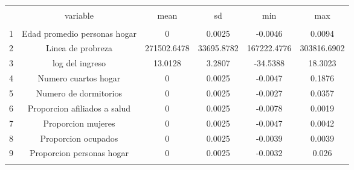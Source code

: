 
\begin{table}[!htbp] \centering 
  \caption{} 
  \label{} 
\begin{tabular}{@{\extracolsep{5pt}} cccccc} 
\\[-1.8ex]\hline 
\hline \\[-1.8ex] 
 & variable & mean & sd & min & max \\ 
\hline \\[-1.8ex] 
1 & Edad promedio personas hogar & 0 & 0.0025 & -0.0046 & 0.0094 \\ 
2 & Linea de probreza & 271502.6478 & 33695.8782 & 167222.4776 & 303816.6902 \\ 
3 & log del ingreso & 13.0128 & 3.2807 & -34.5388 & 18.3023 \\ 
4 & Numero cuartos hogar & 0 & 0.0025 & -0.0047 & 0.1876 \\ 
5 & Numero de dormitorios & 0 & 0.0025 & -0.0027 & 0.0357 \\ 
6 & Proporcion afiliados a salud & 0 & 0.0025 & -0.0078 & 0.0019 \\ 
7 & Proporcion mujeres & 0 & 0.0025 & -0.0047 & 0.0042 \\ 
8 & Proporcion ocupados & 0 & 0.0025 & -0.0039 & 0.0039 \\ 
9 & Proporcion personas hogar & 0 & 0.0025 & -0.0032 & 0.026 \\ 
\hline \\[-1.8ex] 
\end{tabular} 
\end{table} 
